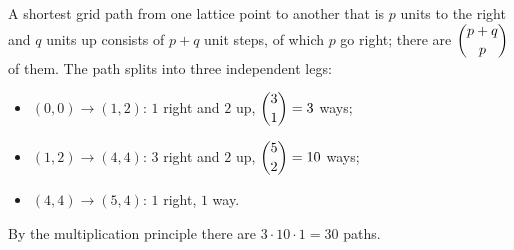 A shortest grid path from one lattice point to another that is $p$ units to the right and $q$ units up consists of $p+q$ unit steps, of which $p$ go right; there are $\dbinom{p+q}{p}$ of them. The path splits into three independent legs:
\begin{itemize}
\item $(0,0)\to(1,2)$: $1$ right and $2$ up, $\dbinom31=3$ ways;
\item $(1,2)\to(4,4)$: $3$ right and $2$ up, $\dbinom52=10$ ways;
\item $(4,4)\to(5,4)$: $1$ right, $1$ way.
\end{itemize}
By the multiplication principle there are $3\cdot10\cdot1=\boxed{30}$ paths.
